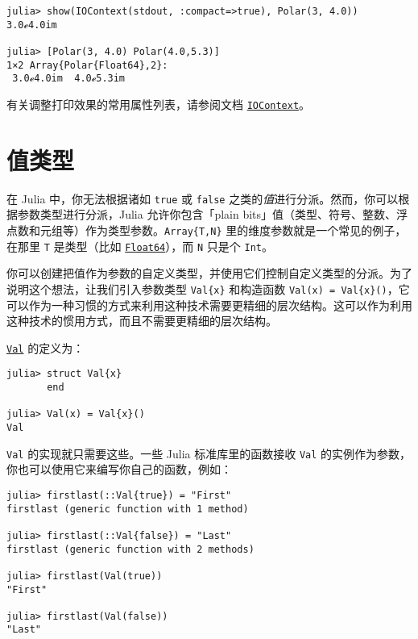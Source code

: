 \begin{verbatim}
julia> show(IOContext(stdout, :compact=>true), Polar(3, 4.0))
3.0ℯ4.0im

julia> [Polar(3, 4.0) Polar(4.0,5.3)]
1×2 Array{Polar{Float64},2}:
 3.0ℯ4.0im  4.0ℯ5.3im
\end{verbatim}



有关调整打印效果的常用属性列表，请参阅文档 \hyperlink{13454403377667762339}{\texttt{IOContext}}。



\hypertarget{764608991862279222}{}


\section{值类型}



在 Julia 中，你无法根据诸如 \texttt{true} 或 \texttt{false} 之类的\emph{值}进行分派。然而，你可以根据参数类型进行分派，Julia 允许你包含「plain bits」值（类型、符号、整数、浮点数和元组等）作为类型参数。\texttt{Array\{T,N\}} 里的维度参数就是一个常见的例子，在那里 \texttt{T} 是类型（比如 \hyperlink{5027751419500983000}{\texttt{Float64}}），而 \texttt{N} 只是个 \texttt{Int}。



你可以创建把值作为参数的自定义类型，并使用它们控制自定义类型的分派。为了说明这个想法，让我们引入参数类型 \texttt{Val\{x\}} 和构造函数 \texttt{Val(x) = Val\{x\}()}，它可以作为一种习惯的方式来利用这种技术需要更精细的层次结构。这可以作为利用这种技术的惯用方式，而且不需要更精细的层次结构。



\hyperlink{1312938105781775871}{\texttt{Val}} 的定义为：




\begin{verbatim}
julia> struct Val{x}
       end

julia> Val(x) = Val{x}()
Val
\end{verbatim}



\texttt{Val} 的实现就只需要这些。一些 Julia 标准库里的函数接收 \texttt{Val} 的实例作为参数，你也可以使用它来编写你自己的函数，例如：




\begin{verbatim}
julia> firstlast(::Val{true}) = "First"
firstlast (generic function with 1 method)

julia> firstlast(::Val{false}) = "Last"
firstlast (generic function with 2 methods)

julia> firstlast(Val(true))
"First"

julia> firstlast(Val(false))
"Last"
\end{verbatim}



